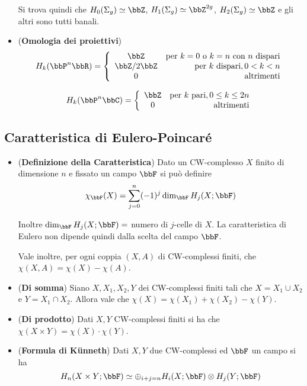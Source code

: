 \documentclass[a4paper,NoNotes,GeneralMath]{stdmdoc}
\begin{document}
\begin{itemize}
  Si trova quindi che $H_0(\Sigma_g) \simeq \bbZ$, $H_1(\Sigma_g) \simeq \bbZ^{2g}$, $H_2(\Sigma_g) \simeq \bbZ$ e gli altri sono tutti banali.
\item ({\bf Omologia dei proiettivi})
  $$ H_k(\bbP^n\bbR) = \left\{
    \begin{array}{cr}
      \bbZ          & \text{per } k = 0 \text{ o } k = n \text{ con } n \text{ dispari} \\
      \bbZ / 2 \bbZ & \text{per } k \text{ dispari}, 0 < k < n                          \\
      0             & \text{altrimenti}                                                 \\
    \end{array}
  \right. $$

  $$ H_k(\bbP^n\bbC) = \left\{
    \begin{array}{cr}
      \bbZ & \text{per } k \text{ pari}, 0 \le k \le 2n \\
      0    & \text{altrimenti}                          \\
    \end{array}
  \right. $$
\end{itemize}

\subsection*{Caratteristica di Eulero-Poincaré}
\begin{itemize}
\item ({\bf Definizione della Caratteristica}) Dato un CW-complesso $X$ finito di dimensione $n$ e fissato un campo $\bbF$ si può definire
  $$ \chi_\bbF(X) = \sum_{j=0}^n (-1)^j \dim_\bbF H_j(X; \bbF) $$

  Inoltre $\dim_\bbF H_j(X; \bbF) = $ numero di $j$-celle di $X$.
  La caratteristica di Eulero non dipende quindi dalla scelta del campo $\bbF$.

  Vale inoltre, per ogni coppia $(X, A)$ di CW-complessi finiti, che $\chi(X, A) = \chi(X) - \chi(A)$.
\item ({\bf Di somma}) Siano $X, X_1, X_2, Y$ dei CW-complessi finiti tali che $X = X_1 \cup X_2$ e $Y = X_1 \cap X_2$.
  Allora vale che $\chi(X) = \chi(X_1) + \chi(X_2) - \chi(Y)$.
\item ({\bf Di prodotto}) Dati $X, Y$ CW-complessi finiti si ha che $\chi(X \times Y) = \chi(X) \cdot \chi(Y)$.
\item ({\bf Formula di Künneth}) Dati $X, Y$ due CW-complessi ed $\bbF$ un campo si ha
  $$ H_n(X \times Y; \bbF) \simeq \oplus_{i+j = n} H_i(X; \bbF) \otimes H_j(Y; \bbF) $$
\end{itemize}
\end{document}
